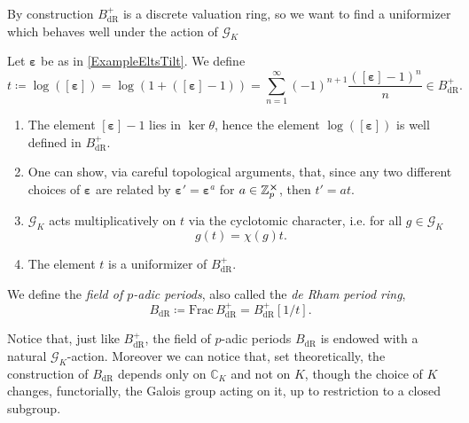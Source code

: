 \noindent
By construction $B_{\mathrm{dR}}^+$ is a discrete valuation ring,
so we want to find a uniformizer which behaves well under the action of $\mathscr{G}_K$
\begin{defn}[]
	Let $\boldsymbol\varepsilon$ be as in \cref{ExampleEltsTilt}.
	We define
	\begin{equation*}
		t \coloneqq \log \left( [\boldsymbol\varepsilon] \right) =
		\log \left( 1 + ([\boldsymbol\varepsilon] - 1)\right) =
		\sum_{n = 1 }^{ \infty } (-1)^{n+1} 
		\frac{ ([\boldsymbol\varepsilon] - 1)^n }{ n }
		\in B_{\mathrm{dR}}^+
	.\end{equation*}
\end{defn}


\begin{rem}\leavevmode\vspace{-\baselineskip}
\begin{enumerate}
	\item The element $[\boldsymbol\varepsilon] - 1 $ lies in
		$\ker \theta$, hence the element $\log ([\boldsymbol\varepsilon])$
		is well defined in $B_{\mathrm{dR}}^+$.

	\item One can show, via careful topological arguments, that,
		since any two different choices of $\boldsymbol\varepsilon$
		are related by $\boldsymbol\varepsilon' = \boldsymbol\varepsilon^a$
		for $a \in \mathbb{Z}_{p}^{\cross}$, then
		$t' = a t$.

	\item $\mathscr{G}_K$ acts multiplicatively on $t$ via the cyclotomic character,
		i.e. for all $g \in \mathscr{G}_K$
		\begin{equation*}
		g(t) = \chi(g) t
		.\end{equation*}

	\item The element $t$ is a uniformizer of $B_{\mathrm{dR}}^+$.
\end{enumerate}
\end{rem}


\begin{defn}
	We define the {\em field of $p$-adic periods}, also called
	the {\em de Rham period ring},
	\begin{equation*}
	B_{\mathrm{dR}} \coloneqq \mathrm{Frac}\, B_{\mathrm{dR}}^+ =
	B_{\mathrm{dR}}^+[1/t]
	.\end{equation*}
\end{defn}


\begin{rem}[]
	Notice that, just like $B_{\mathrm{dR}}^+$, the field of $p$-adic periods
	$B_{\mathrm{dR}}$ is endowed with a natural $\mathscr{G}_K$-action.
	Moreover we can notice that, set theoretically, the construction of
	$B_{\mathrm{dR}}$ depends only on $\mathbb{C}_K$ and not on $K$,
	though the choice of $K$ changes, functorially, the Galois group acting on it,
	up to restriction to a closed subgroup.
\end{rem}



